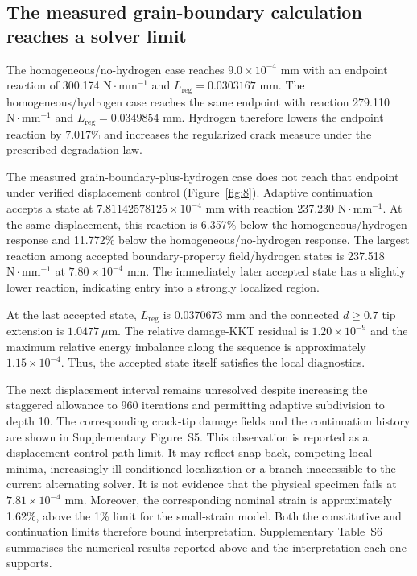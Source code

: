 \documentclass[preprint,12pt]{elsarticle}
\begin{document}
\subsection{The measured grain-boundary calculation reaches a solver limit}

The homogeneous/no-hydrogen case reaches \(9.0\times10^{-4}\) mm with an endpoint reaction of 300.174 \(\mathrm{N}\!\cdot\!\mathrm{mm}^{-1}\) and \(L_{\mathrm{reg}}=0.0303167\) mm. The homogeneous/hydrogen case reaches the same endpoint with reaction 279.110 \(\mathrm{N}\!\cdot\!\mathrm{mm}^{-1}\) and \(L_{\mathrm{reg}}=0.0349854\) mm. Hydrogen therefore lowers the endpoint reaction by 7.017\% and increases the regularized crack measure under the prescribed degradation law.

The measured grain-boundary-plus-hydrogen case does not reach that endpoint under verified displacement control (Figure~\ref{fig:8}). Adaptive continuation accepts a state at \(7.81142578125\times10^{-4}\) mm with reaction 237.230 \(\mathrm{N}\!\cdot\!\mathrm{mm}^{-1}\). At the same displacement, this reaction is 6.357\% below the homogeneous/hydrogen response and 11.772\% below the homogeneous/no-hydrogen response. The largest reaction among accepted boundary-property field/hydrogen states is 237.518 \(\mathrm{N}\!\cdot\!\mathrm{mm}^{-1}\) at \(7.80\times10^{-4}\) mm. The immediately later accepted state has a slightly lower reaction, indicating entry into a strongly localized region.

At the last accepted state, \(L_{\mathrm{reg}}\) is 0.0370673 mm and the connected \(d\ge0.7\) tip extension is \(1.0477~\mu\mathrm{m}\). The relative damage-KKT residual is \(1.20\times10^{-9}\) and the maximum relative energy imbalance along the sequence is approximately \(1.15\times10^{-4}\). Thus, the accepted state itself satisfies the local diagnostics.

The next displacement interval remains unresolved despite increasing the staggered allowance to 960 iterations and permitting adaptive subdivision to depth 10. The corresponding crack-tip damage fields and the continuation history are shown in Supplementary Figure~S5. This observation is reported as a displacement-control path limit. It may reflect snap-back, competing local minima, increasingly ill-conditioned localization or a branch inaccessible to the current alternating solver. It is not evidence that the physical specimen fails at \(7.81\times10^{-4}\) mm. Moreover, the corresponding nominal strain is approximately 1.62\%, above the 1\% limit for the small-strain model. Both the constitutive and continuation limits therefore bound interpretation. Supplementary Table~S6 summarises the numerical results reported above and the interpretation each one supports.
\end{document}
